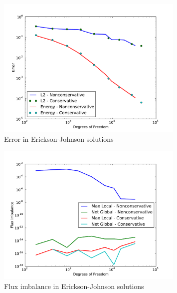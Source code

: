\documentclass[letterpaper]{article}
\begin{document}
\begin{figure}[p]
\centering
\includegraphics[width=0.8\textwidth]{figs/Erickson/modifiedError.pdf}
\caption{Error in Erickson-Johnson solutions}
\label{fig:ericksonError}
\end{figure}

\begin{figure}[h!]
\centering
\includegraphics[width=0.8\textwidth]{figs/Erickson/graphFlux.pdf}
\caption{Flux imbalance in Erickson-Johnson solutions}
\label{ericksonFlux}
\end{figure}
\end{document}
